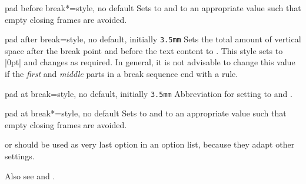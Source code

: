 \begin{docTcbKey}{pad before break*}{=}{style, no default}
  Sets  to  and
   to an appropriate value such that
  empty closing frames are avoided.
\end{docTcbKey}

\begin{docTcbKey}{pad after break}{=}{style, no default, initially \texttt{3.5mm}}
  Sets the total amount of vertical space after the break point and before the
  text content to . This style sets  to |0pt|
  and changes  as required.
  In general, it is not advisable to change this value if the
  \emph{first} and \emph{middle} parts in a break sequence end with a rule.
\end{docTcbKey}

\begin{docTcbKey}{pad at break}{=}{style, no default, initially \texttt{3.5mm}}
  Abbreviation for setting  to 
  and .
\end{docTcbKey}


\begin{dispListing}

\begin{tcolorbox}[enhanced jigsaw,breakable,pad at break=0mm,
  title={For this box, the pad space at the break point is set to 0mm}]
  \lipsum[1-2]
\end{tcolorbox}
\end{dispListing}
{\tcbusetemp}

\begin{docTcbKey}{pad at break*}{=}{style, no default}
  Sets  to  and
   to an appropriate value such that
  empty closing frames are avoided.
\end{docTcbKey}

\begin{marker}
 or 
should be used as very last option in an option list, because
they adapt other settings.
\end{marker}


\begin{marker}
Also see 
and .
\end{marker}


